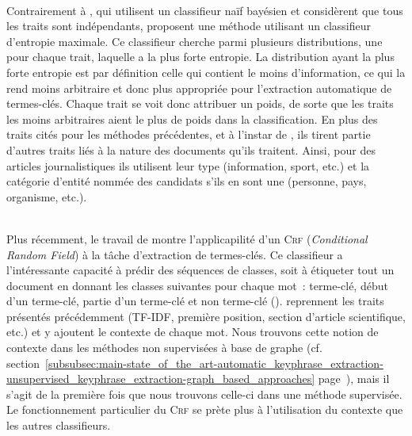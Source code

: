         ~\\Contrairement à , qui utilisent un classifieur
        naïf bayésien et considèrent que tous les traits sont indépendants,
         proposent une méthode utilisant un
        classifieur d'entropie maximale. Ce classifieur cherche parmi plusieurs
        distributions, une pour chaque trait, laquelle a la plus forte entropie.
        La distribution ayant la plus forte entropie est par définition celle
        qui contient le moins d'information, ce qui la rend moins arbitraire et
        donc plus appropriée pour l'extraction automatique de termes-clés.
        Chaque trait se voit donc attribuer un poids, de sorte que les traits
        les moins arbitraires aient le plus de poids dans la classification. En
        plus des traits cités pour les méthodes précédentes, et à l'instar de
        , ils tirent partie d'autres
        traits liés à la nature des documents qu'ils traitent. Ainsi, pour des
        articles journalistiques ils utilisent leur type (information, sport,
        etc.) et la catégorie d'entité nommée des candidats s'ils en sont une
        (personne, pays, organisme, etc.).

        ~\\Plus récemment, le travail de 
        montre l'applicapilité d'un \textsc{Crf} (\textit{Conditional Random
        Field}) à la tâche d'extraction de termes-clés. Ce classifieur a
        l'intéressante capacité à prédir des séquences de classes, soit à
        étiqueter tout un document en donnant les classes suivantes pour chaque
        mot~: \og{}terme-clé\fg{}, \og{}début d'un terme-clé\fg{}, \og{}partie
        d'un terme-clé\fg{} et \og{}non terme-clé\fg{} (). 
        reprennent les traits présentés précédemment (TF-IDF, première position,
        section d'article scientifique, etc.) et y ajoutent le contexte de
        chaque mot. Nous trouvons cette notion de contexte dans les méthodes non
        supervisées à base de graphe (cf.
        section~\ref{subsubsec:main-state_of_the_art-automatic_keyphrase_extraction-unsupervised_keyphrase_extraction-graph_based_approaches}
        page~\pageref{subsubsec:main-state_of_the_art-automatic_keyphrase_extraction-unsupervised_keyphrase_extraction-graph_based_approaches}),
        mais il s'agit de la première fois que nous trouvons celle-ci dans une
        méthode supervisée. Le fonctionnement particulier du \textsc{Crf} se
        prète plus à l'utilisation du contexte que les autres classifieurs.

